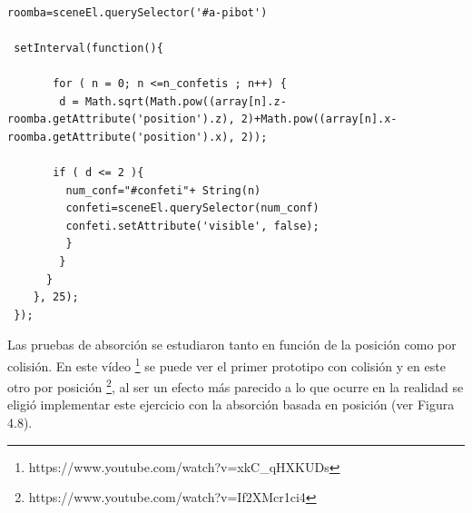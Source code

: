 \begin{lstlisting}

roomba=sceneEl.querySelector('#a-pibot')

 setInterval(function(){

       for ( n = 0; n <=n_confetis ; n++) {
        d = Math.sqrt(Math.pow((array[n].z-roomba.getAttribute('position').z), 2)+Math.pow((array[n].x-roomba.getAttribute('position').x), 2));

       if ( d <= 2 ){
         num_conf="#confeti"+ String(n)
         confeti=sceneEl.querySelector(num_conf)
         confeti.setAttribute('visible', false);
         }
        }
      }
    }, 25);
 });
\end{lstlisting}

Las pruebas de absorción se estudiaron tanto en función de la posición como por colisión. En este vídeo \footnote{https://www.youtube.com/watch?v=xkC\_qHXKUDs} se puede ver el primer prototipo con colisión y en este otro por posición \footnote{https://www.youtube.com/watch?v=If2XMcr1ci4}, al ser un efecto más parecido a lo que ocurre en la realidad se eligió implementar este ejercicio con la absorción basada en posición (ver Figura 4.8).

